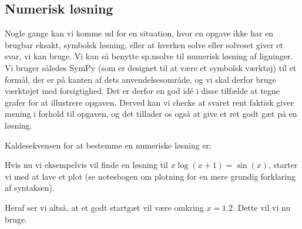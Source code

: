 \documentclass[letterpaper,10pt,english]{jupyterBook}
\begin{document}
\subsection{Numerisk løsning}
\label{\detokenize{notebooks/sympy/Notebook3_ligninger:numerisk-losning}}
Nogle gange kan vi komme ud for en situation, hvor en opgave ikke har en brugbar eksakt, symbolsk løsning, eller at hverken solve eller solveset giver et svar, vi kan bruge. Vi kan så benytte sp.nsolve til numerisk løsning af ligninger. Vi bruger således SymPy (som er designet til at være et symbolsk værktøj) til et formål, der er på kanten af dets anvendelsesområde, og vi skal derfor bruge værktøjet med forsigtighed. Det er derfor en god idé i disse tilfælde at tegne grafer for at illustrere opgaven. Derved kan vi checke at svaret rent faktisk giver mening i forhold til opgaven, og det tillader os også at give et ret godt gæt på en løsning.

Kaldesekvensen for at bestemme en numeriske løsning er:

\begin{sphinxVerbatim}[commandchars=\\\{\}]
  
\end{sphinxVerbatim}

Hvis nu vi eksempelvis vil finde en løsning til \(x\log(x+1) = \sin(x)\), starter vi med at lave et plot (se notesbogen om plotning for en mere grundig forklaring af syntaksen).

\begin{sphinxVerbatim}[commandchars=\\\{\}]
   
   

          
\end{sphinxVerbatim}

\noindent{}

Heraf ser vi altså, at et godt startgæt vil være omkring \(x=1.2\). Dette vil vi nu bruge.
\end{document}
